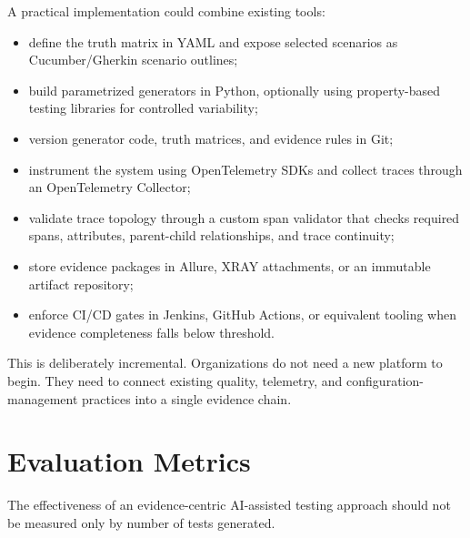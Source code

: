 \documentclass[11pt,a4paper]{article}
\begin{document}
A practical implementation could combine existing tools:
\begin{itemize}
\item define the truth matrix in YAML and expose selected scenarios as Cucumber/Gherkin scenario outlines;
\item build parametrized generators in Python, optionally using property-based testing libraries for controlled variability;
\item version generator code, truth matrices, and evidence rules in Git;
\item instrument the system using OpenTelemetry SDKs and collect traces through an OpenTelemetry Collector;
\item validate trace topology through a custom span validator that checks required spans, attributes, parent-child relationships, and trace continuity;
\item store evidence packages in Allure, XRAY attachments, or an immutable artifact repository;
\item enforce CI/CD gates in Jenkins, GitHub Actions, or equivalent tooling when evidence completeness falls below threshold.
\end{itemize}

This is deliberately incremental. Organizations do not need a new platform to begin. They need to connect existing quality, telemetry, and configuration-management practices into a single evidence chain.

\section{Evaluation Metrics}

The effectiveness of an evidence-centric AI-assisted testing approach should not be measured only by number of tests generated.
\end{document}
